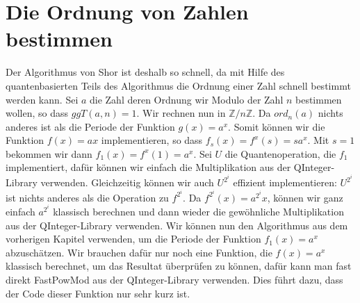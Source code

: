 \section{Die Ordnung von Zahlen bestimmen}
Der Algorithmus von Shor ist deshalb so schnell, da mit Hilfe des quantenbasierten Teils des Algorithmus die Ordnung einer Zahl schnell bestimmt werden kann. Sei $a$ die Zahl deren Ordnung wir Modulo der Zahl $n$ bestimmen wollen, so dass $ggT(a, n) = 1$.  Wir rechnen nun in $\mathbb{Z} / n \mathbb{Z}$. Da $ord_n(a)$ nichts anderes ist als die Periode der Funktion $g(x) = a^x$. Somit können wir die Funktion $f(x) = ax$ implementieren, so dass $f_s(x) = f^x(s) = sa^x$. Mit $s = 1$ bekommen wir dann $f_1(x) = f^x(1) = a^x$. Sei $U$ die Quantenoperation, die $f_1$ implementiert, dafür können wir einfach die Multiplikation aus der QInteger-Library verwenden. Gleichzeitig können wir auch $U^{2^i}$ effizient implementieren: $U^{2^i}$ ist nichts anderes als die Operation zu $f^{2^i}$. Da $f^{2^i}(x) = a^{2^i}x$, können wir ganz einfach $a^{2^i}$ klassisch berechnen und dann wieder die gewöhnliche Multiplikation aus der QInteger-Library verwenden. Wir können nun den Algorithmus aus dem vorherigen Kapitel verwenden, um die Periode der Funktion $f_1(x) = a^x$ abzuschätzen. Wir brauchen dafür nur noch eine Funktion, die $f(x) = a^x$ klassisch berechnet, um das Resultat überprüfen zu können, dafür kann man fast direkt FastPowMod aus der QInteger-Library verwenden. Dies führt dazu, dass der Code dieser Funktion nur sehr kurz ist.

